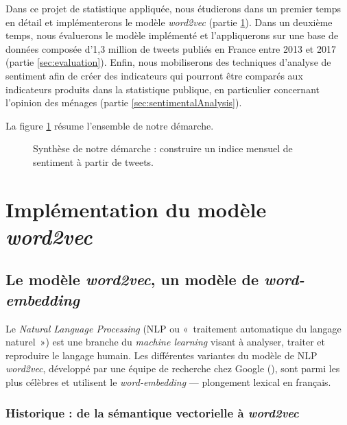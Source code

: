 \documentclass[11pt,french,french]{article}
\begin{document}
Dans ce projet de statistique appliquée, nous étudierons dans un premier
temps en détail et implémenterons le modèle \emph{word2vec} (partie
\ref{sec:word2vec}). Dans un deuxième temps, nous évaluerons le modèle
implémenté et l'appliquerons sur une base de données composée d'1,3
million de tweets publiés en France entre 2013 et 2017 (partie
\ref{sec:evaluation}). Enfin, nous mobiliserons des techniques d'analyse
de sentiment afin de créer des indicateurs qui pourront être comparés
aux indicateurs produits dans la statistique publique, en particulier
concernant l'opinion des ménages (partie \ref{sec:sentimentalAnalysis}).

La figure \ref{fig:schemaRecap} résume l'ensemble de notre démarche.

\vspace{2cm}

\begin{figure}[!htb]

\captionsetup{margin=0cm,format=hang,justification=justified}
\caption{Synthèse de notre démarche : construire un indice mensuel de sentiment à partir de tweets.}\label{fig:schemaRecap}
\end{figure}

\newpage

\section{\texorpdfstring{Implémentation du modèle
\emph{word2vec}}{Implémentation du modèle word2vec}}\label{sec:word2vec}

\subsection{\texorpdfstring{Le modèle \emph{word2vec}, un modèle de
\emph{word-embedding}}{Le modèle word2vec, un modèle de word-embedding}}\label{le-moduxe8le-word2vec-un-moduxe8le-de-word-embedding}

Le \emph{Natural Language Processing} (NLP ou «~traitement automatique
du langage naturel~») est une branche du \emph{machine learning} visant
à analyser, traiter et reproduire le langage humain. Les différentes
variantes du modèle de NLP \emph{word2vec}, développé par une équipe de
recherche chez Google (\cite{Mikolov}), sont parmi les plus célèbres et
utilisent le \emph{word-embedding} --- plongement lexical en français.

\subsubsection{\texorpdfstring{Historique : de la sémantique vectorielle
à
\emph{word2vec}}{Historique : de la sémantique vectorielle à word2vec}}\label{historique-de-la-suxe9mantique-vectorielle-uxe0-word2vec}
\end{document}
